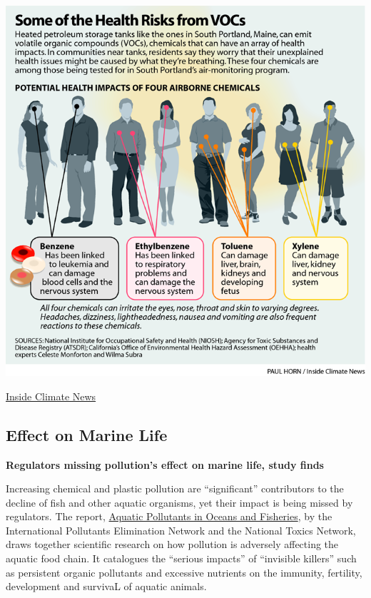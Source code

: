 \documentclass[
]{book}
\begin{document}
\includegraphics{fig/VOCs_Chemical_Health_Effects.png}

\href{https://insideclimatenews.org/news/18042021/toxic-neighbords-tank-fumes-epa-harmful-chemicals/}{Inside Climate News}

\hypertarget{effect-on-marine-life}{%
\subsection{Effect on Marine Life}\label{effect-on-marine-life}}

\textbf{Regulators missing pollution's effect on marine life, study finds}

Increasing chemical and plastic pollution are ``significant'' contributors to the decline of fish and other aquatic organisms, yet their impact is being missed by regulators.
The report, \href{https://ipen.org/transfer/embargo/aquatic_pollutants_in_oceans_and_fisheries_ipen-en.pdf}{Aquatic Pollutants in Oceans and Fisheries}, by the International Pollutants Elimination Network and the National Toxics Network, draws together scientific research on how pollution is adversely affecting the aquatic food chain. It catalogues the ``serious impacts'' of ``invisible killers'' such as persistent organic pollutants and excessive nutrients on the immunity, fertility, development and survivaL of aquatic animals.
\end{document}
